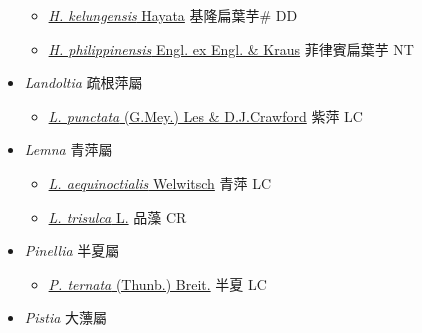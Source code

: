 \begin{itemize}
  \begin{itemize}
        \item[] \href{http://www.theplantlist.org/tpl1.1/search?q=Homalomena+kelungensis}{\textit{H. kelungensis} Hayata}   基隆扁葉芋\# DD
        \item[] \href{http://www.theplantlist.org/tpl1.1/search?q=Homalomena+philippinensis}{\textit{H. philippinensis} Engl. ex Engl. \& Kraus}   菲律賓扁葉芋 NT
  \end{itemize}
 \item[] \textit{Landoltia} 疏根萍屬
                    
  \begin{itemize}
        \item[] \href{http://www.theplantlist.org/tpl1.1/search?q=Landoltia+punctata}{\textit{L. punctata} (G.Mey.) Les \& D.J.Crawford}     紫萍 LC
  \end{itemize}
 \item[] \textit{Lemna} 青萍屬
                    
  \begin{itemize}
        \item[] \href{http://www.theplantlist.org/tpl1.1/search?q=Lemna+aequinoctialis}{\textit{L. aequinoctialis} Welwitsch}   青萍 LC
        \item[] \href{http://www.theplantlist.org/tpl1.1/search?q=Lemna+trisulca}{\textit{L. trisulca} L.}   品藻 CR
  \end{itemize}
 \item[] \textit{Pinellia} 半夏屬
                    
  \begin{itemize}
        \item[] \href{http://www.theplantlist.org/tpl1.1/search?q=Pinellia+ternata}{\textit{P. ternata} (Thunb.) Breit.}   半夏 LC
  \end{itemize}
 \item[] \textit{Pistia} 大薸屬
                    

\end{itemize}
